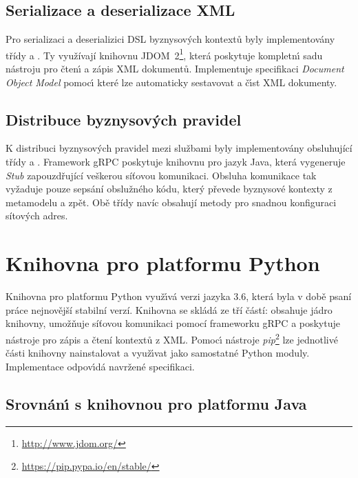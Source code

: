 \subsection{Serializace a deserializace XML}

Pro serializaci a deserializici \gls{DSL} byznysových kontextů byly implementovány třídy
 a . Ty využívají knihovnu
JDOM~2\footnote{\url{http://www.jdom.org/}}, která poskytuje
kompletn\'{\i} sadu nástroju pro čten\'{\i} a zápis \gls{XML} dokumentů.
Implementuje specifikaci \textit{Document Object Model}
pomoc\'{\i} které lze automaticky sestavovat a č\'{\i}st \gls{XML} dokumenty.

\subsection{Distribuce byznysových pravidel}

K distribuci byznysových pravidel mezi službami byly implementovány obsluhující třídy
 a .
Framework gRPC poskytuje knihovnu pro jazyk Java, která vygeneruje \textit{Stub}
zapouzdřující veškerou síťovou komunikaci. Obsluha komunikace tak vyžaduje pouze
sepsání obslužného kódu, který převede byznysové kontexty z metamodelu a zpět.
Obě třídy navíc obsahují metody pro snadnou konfiguraci sítových adres.

\section{Knihovna pro platformu Python}

Knihovna pro platformu Python využ\'{\i}vá verzi jazyka 3.6, která byla v době
psaní práce nejnovější stabilní verzí. Knihovna se skládá ze tří částí:  obsahuje jádro knihovny,
 umožňuje síťovou komunikaci pomocí frameworku
gRPC a  poskytuje nástroje pro zápis a čtení kontextů z \gls{XML}.
Pomoc\'{\i} nástroje \textit{pip}\footnote{\url{https://pip.pypa.io/en/stable/}}
lze jednotlivé části knihovny nainstalovat a využ\'{\i}vat jako samostatné
Python moduly. Implementace odpov\'{\i}dá navržené specifikaci.

\subsection{Srovnán\'{\i} s knihovnou pro platformu Java}

